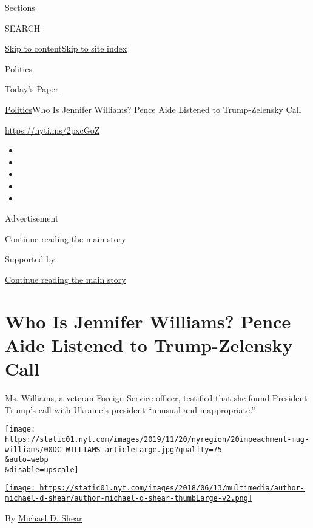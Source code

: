Sections

SEARCH

\protect\hyperlink{site-content}{Skip to
content}\protect\hyperlink{site-index}{Skip to site index}

\href{https://www.nytimes.com/section/politics}{Politics}

\href{https://myaccount.nytimes.com/auth/login?response_type=cookie\&client_id=vi}{}

\href{https://www.nytimes.com/section/todayspaper}{Today's Paper}

\href{/section/politics}{Politics}\textbar{}Who Is Jennifer Williams?
Pence Aide Listened to Trump-Zelensky Call

\url{https://nyti.ms/2pxcGoZ}

\begin{itemize}
\item
\item
\item
\item
\item
\end{itemize}

Advertisement

\protect\hyperlink{after-top}{Continue reading the main story}

Supported by

\protect\hyperlink{after-sponsor}{Continue reading the main story}

\hypertarget{who-is-jennifer-williams-pence-aide-listened-to-trump-zelensky-call}{%
\section{Who Is Jennifer Williams? Pence Aide Listened to Trump-Zelensky
Call}\label{who-is-jennifer-williams-pence-aide-listened-to-trump-zelensky-call}}

Ms. Williams, a veteran Foreign Service officer, testified that she
found President Trump's call with Ukraine's president ``unusual and
inappropriate.''

\texttt{[image: https://static01.nyt.com/images/2019/11/20/nyregion/20impeachment-mug-williams/00DC-WILLIAMS-articleLarge.jpg?quality=75\\\&auto=webp\\\&disable=upscale]}

\href{https://www.nytimes.com/by/michael-d-shear}{\texttt{[image: https://static01.nyt.com/images/2018/06/13/multimedia/author-michael-d-shear/author-michael-d-shear-thumbLarge-v2.png]}}

By \href{https://www.nytimes.com/by/michael-d-shear}{Michael D. Shear}

